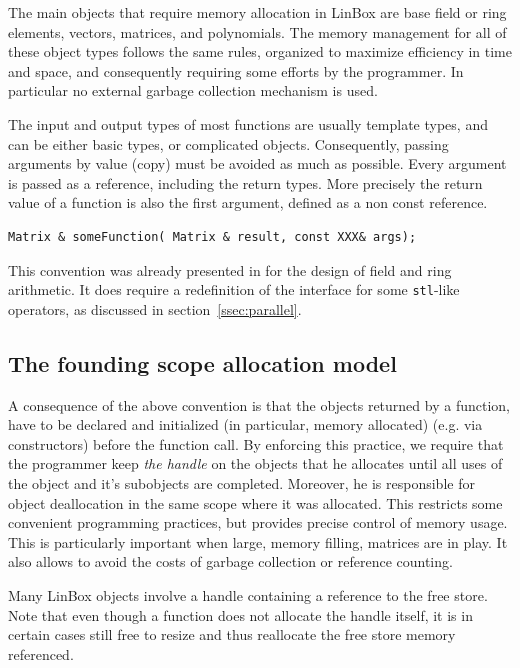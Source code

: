 \documentclass[runningheads,a4paper]{llncs}
\newcommand{\linbox}{{\sc LinBox}\xspace}
\begin{document}
The main objects that require memory allocation in \linbox are base field or
ring elements, vectors, matrices, and polynomials.
The memory management for all of these object types follows the same rules, organized to
maximize efficiency in time and space, and consequently requiring some
efforts by  the programmer. In particular no external garbage collection
mechanism is used.

The input and output types of most functions are usually template
types, and can be either basic types, or complicated
objects. Consequently, passing arguments by value (copy) must be avoided as
much as possible. Every argument is passed as a reference, including
the return types. More precisely the return value of a function is
also the first argument, defined as a non const reference. 

\begin{verbatim}
Matrix & someFunction( Matrix & result, const XXX& args);
\end{verbatim}

This convention was already presented in \cite[\S 2.1]{jgd:2002:icms} for the
design of field and ring arithmetic. It does require a redefinition of the interface
for some \texttt{stl}-like operators, as discussed in
section~\ref{ssec:parallel}.

\subsection{The founding scope allocation model}

A consequence of the above convention is that the objects returned by
a function,
have to be declared and initialized (in particular, memory allocated) (e.g. via constructors) before the
function call.
By enforcing this
practice, we require that the programmer keep 
\textit{the handle} on the
objects that he allocates until all uses of the object and it's subobjects are completed. Moreover, he is responsible for object 
deallocation in the same 
scope where it was allocated. 
This restricts some convenient programming practices, but provides precise control of memory usage.
This is particularly important when large, memory filling, matrices
are in play.
It also allows to avoid the costs of garbage 
collection or reference counting.

Many LinBox objects involve a handle containing a reference to the free store.
Note that even though a function does not allocate the handle itself,
it is in certain cases still free to resize and thus reallocate the free store memory referenced.
\end{document}
